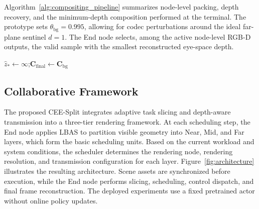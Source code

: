 \documentclass[acmsmall]{acmart}
\begin{document}
Algorithm~\ref{alg:compositing_pipeline} summarizes node-level packing, depth recovery, and the minimum-depth composition performed at the terminal.
The prototype sets $\theta_{\mathrm{bg}}=0.995$, allowing for codec perturbations around the ideal far-plane sentinel $d=1$. The End node selects, among the active node-level RGB-D outputs, the valid sample with the smallest reconstructed eye-space depth.

\begin{algorithm}[htbp]
	\caption{Node-Level LDP and Minimum-Depth Composition}
	\label{alg:compositing_pipeline}
	\BlankLine
	\BlankLine
	$\widehat z_*\gets\infty$;\enskip $\mathbf{C}_{\mathrm{final}}\gets\mathbf{C}_{\mathrm{bg}}$\;
\end{algorithm}


\subsection{Collaborative Framework}

The proposed CEE-Split integrates adaptive task slicing and depth-aware transmission into a three-tier rendering framework. At each scheduling step, the End node applies LBAS to partition visible geometry into Near, Mid, and Far layers, which form the basic scheduling units. Based on the current workload and system conditions, the scheduler determines the rendering node, rendering resolution, and transmission configuration for each layer. Figure~\ref{fig:architecture} illustrates the resulting architecture. Scene assets are synchronized before execution, while the End node performs slicing, scheduling, control dispatch, and final frame reconstruction. The deployed experiments use a fixed pretrained actor without online policy updates.
\end{document}
